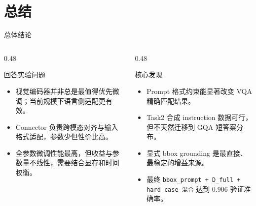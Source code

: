 \documentclass{beamer}
\begin{document}
\section{总结}

\begin{frame}{总体结论}
\small
\begin{columns}[T,onlytextwidth]
\begin{column}{0.48\textwidth}
\begin{block}{回答实验问题}
\begin{itemize}
\item 视觉编码器并非总是最值得优先微调；当前规模下语言侧适配更有效。
\item Connector 负责跨模态对齐与输入格式适配，参数少但性价比高。
\item 全参数微调性能最高，但收益与参数量不线性，需要结合显存和时间权衡。
\end{itemize}
\end{block}
\end{column}
\begin{column}{0.48\textwidth}
\begin{block}{核心发现}
\begin{itemize}
\item Prompt 格式约束能显著改变 VQA 精确匹配结果。
\item Task2 合成 instruction 数据可行，但不天然迁移到 GQA 短答案分布。
\item 显式 bbox grounding 是最直接、最稳定的增益来源。
\item 最终 \texttt{bbox\_prompt + D\_full + hard case 混合} 达到 0.906 验证准确率。
\end{itemize}
\end{block}
\end{column}
\end{columns}
\end{frame}

\backmatter
\end{document}
